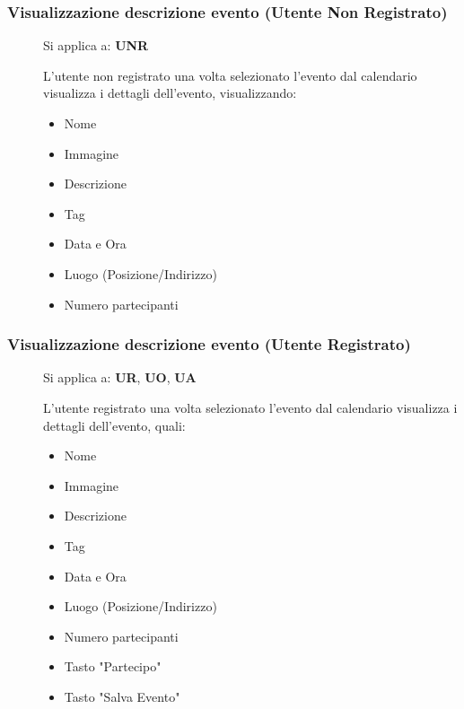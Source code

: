 \documentclass{article}
\begin{document}
\subsubsection{Visualizzazione descrizione evento (Utente Non Registrato)} \label{rf_3}
\begin{description}
    \item[] Si applica a: \textbf{UNR}
    \item[] L'utente non registrato una volta selezionato l'evento dal calendario visualizza i dettagli dell'evento, visualizzando:
        \begin{itemize}
            \item Nome
            \item Immagine
            \item Descrizione
            \item Tag
            \item Data e Ora
            \item Luogo (Posizione/Indirizzo)
            \item Numero partecipanti
        \end{itemize}
\end{description}
\subsubsection{Visualizzazione descrizione evento (Utente Registrato)} \label{rf_4}
\begin{description}
    \item[] Si applica a: \textbf{UR}, \textbf{UO}, \textbf{UA}
    \item[] L'utente registrato una volta selezionato l'evento dal calendario visualizza i dettagli dell'evento, quali:
        \begin{itemize}
            \item Nome
            \item Immagine
            \item Descrizione
            \item Tag
            \item Data e Ora
            \item Luogo (Posizione/Indirizzo)
            \item Numero partecipanti
            \item Tasto "Partecipo"
            \item Tasto "Salva Evento"
        \end{itemize}
\end{description}
\end{document}
